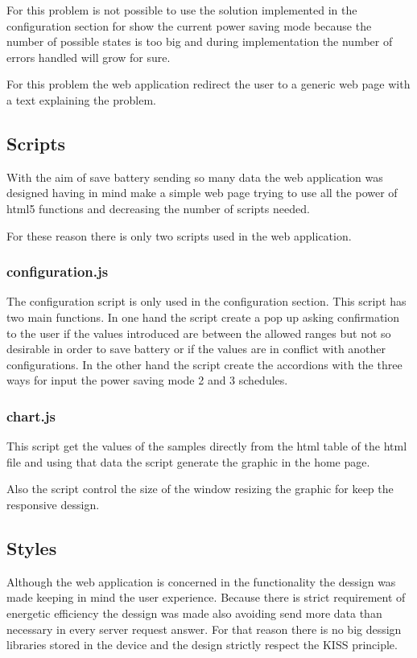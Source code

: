 		For this problem is not possible to use the solution implemented in the configuration section for show the current power saving mode because the number of possible states is too big and during implementation the number of errors handled will grow for sure.

		For this problem the web application redirect the user to a generic web page with a text explaining the problem.

		\subsection{Scripts}
		With the aim of save battery sending so many data the web application was designed having in mind make a simple web page trying to use all the power of html5 functions and decreasing the number of scripts needed.

		For these reason there is only two scripts used in the web application.

		\subsubsection{configuration.js}
		The configuration script is only used in the configuration section. This script has two main functions. In one hand the script create a pop up asking confirmation to the user if the values introduced are between the allowed ranges but not so desirable in order to save battery or if the values are in conflict with another configurations. In the other hand the script create the accordions with the three ways for input the power saving mode 2 and 3 schedules.

		\subsubsection{chart.js}
		This script get the values of the samples directly from the html table of the html file and using that data the script generate the graphic in the home page.

		Also the script control the size of the window resizing the graphic for keep the responsive dessign.

		\subsection{Styles} %
		Although the web application is concerned in the functionality the dessign was made keeping in mind the user experience. Because there is strict requirement of energetic efficiency the dessign was made also avoiding send more data than necessary in every server request answer. For that reason there is no big dessign libraries stored in the device and the design strictly respect the KISS principle.

